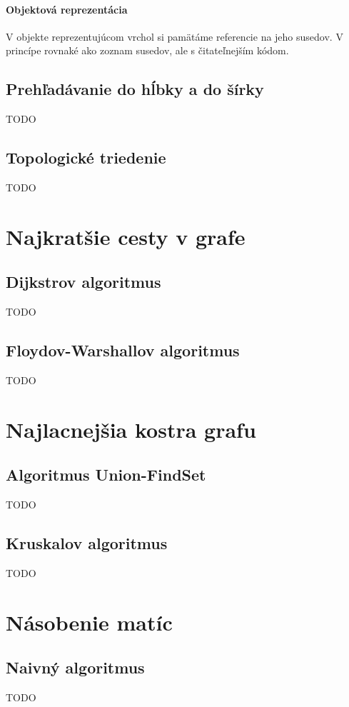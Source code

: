 		\paragraph{Objektová reprezentácia}
		V objekte reprezentujúcom vrchol si pamätáme referencie na jeho susedov. V princípe rovnaké ako zoznam susedov, ale s čitateľnejším kódom.
		
	\subsection{Prehľadávanie do hĺbky a do šírky} TODO
	\subsection{Topologické triedenie} TODO

\section{Najkratšie cesty v grafe}

	\subsection{Dijkstrov algoritmus} TODO
	\subsection{Floydov-Warshallov algoritmus} TODO

\section{Najlacnejšia kostra grafu}

	\subsection{Algoritmus Union-FindSet} TODO
	\subsection{Kruskalov algoritmus} TODO

\section{Násobenie matíc}

	\subsection{Naivný algoritmus} TODO
